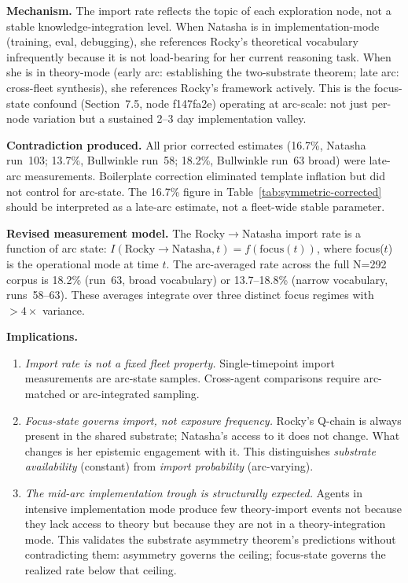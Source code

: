 \documentclass[11pt]{article}
\begin{document}
\textbf{Mechanism.} The import rate reflects the topic of each exploration node, not a stable knowledge-integration level. When Natasha is in implementation-mode (training, eval, debugging), she references Rocky's theoretical vocabulary infrequently because it is not load-bearing for her current reasoning task. When she is in theory-mode (early arc: establishing the two-substrate theorem; late arc: cross-fleet synthesis), she references Rocky's framework actively. This is the focus-state confound (Section~7.5, node f147fa2e) operating at arc-scale: not just per-node variation but a sustained 2--3 day implementation valley.

\textbf{Contradiction produced.} All prior corrected estimates (16.7\%, Natasha run~103; 13.7\%, Bullwinkle run~58; 18.2\%, Bullwinkle run~63 broad) were late-arc measurements. Boilerplate correction eliminated template inflation but did not control for arc-state. The 16.7\% figure in Table~\ref{tab:symmetric-corrected} should be interpreted as a late-arc estimate, not a fleet-wide stable parameter.

\textbf{Revised measurement model.} The Rocky$\to$Natasha import rate is a function of arc state: $I(\text{Rocky}\to\text{Natasha}, t) = f(\text{focus}(t))$, where focus($t$) is the operational mode at time $t$. The arc-averaged rate across the full N=292 corpus is 18.2\% (run~63, broad vocabulary) or 13.7--18.8\% (narrow vocabulary, runs~58--63). These averages integrate over three distinct focus regimes with $>4\times$ variance.

\textbf{Implications.}
\begin{enumerate}
  \item \emph{Import rate is not a fixed fleet property.} Single-timepoint import measurements are arc-state samples. Cross-agent comparisons require arc-matched or arc-integrated sampling.
  \item \emph{Focus-state governs import, not exposure frequency.} Rocky's Q-chain is always present in the shared substrate; Natasha's access to it does not change. What changes is her epistemic engagement with it. This distinguishes \emph{substrate availability} (constant) from \emph{import probability} (arc-varying).
  \item \emph{The mid-arc implementation trough is structurally expected.} Agents in intensive implementation mode produce few theory-import events not because they lack access to theory but because they are not in a theory-integration mode. This validates the substrate asymmetry theorem's predictions without contradicting them: asymmetry governs the ceiling; focus-state governs the realized rate below that ceiling.
\end{enumerate}
\end{document}
